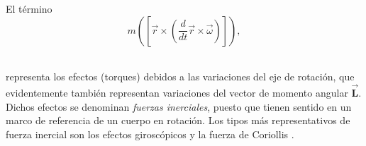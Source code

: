 \noindent El término
$$
m\left(\left[\vec{r}\times\left( \frac{d}{dt}\vec{r}\times \vec{\omega}\right)\right]\right),
$$\

\noindent representa los efectos (torques) debidos a las variaciones del eje de rotación, que evidentemente también representan variaciones del vector de momento angular $\vec{\mathbf{L}}$. Dichos efectos se denominan \emph{fuerzas inerciales}, puesto que tienen sentido en un marco de referencia de un cuerpo en rotación. Los tipos más representativos de fuerza inercial son los efectos giroscópicos y la fuerza de Coriollis .
